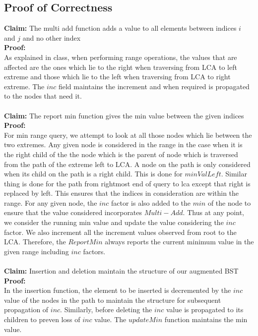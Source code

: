 \documentclass{article}
\begin{document}
\subsection*{Proof of Correctness}
\textbf{Claim:} The multi add function adds a value to all elements between indices $i$ and $j$ and no other index \\
\textbf{Proof:} \\As explained in class, when performing range operations, the values that are affected are the ones which lie to the right when traversing from LCA to left extreme and those which lie to the left when traversing from LCA to right extreme. The $inc$ field maintains the increment and when required is propagated to the nodes that need it. \\ \\
\textbf{Claim:} The report min function gives the min value between the given indices \\
\textbf{Proof:} \\For min range query, we attempt to look at all those nodes which lie between the two extremes. Any given node is considered in the range in the case when it is the right child of the the node which is the parent of node which is traversed from the path of the extreme left to LCA. A node on the path is only considered when its child on the path is a right child. This is done for $minValLeft$. Similar thing is done for the path from rightmost end of query to lca except that right is replaced by left. This ensures that the indices in consideration are within the range. For any given node, the $inc$ factor is also added to the $min$ of the node to ensure that the value considered incorporates $Multi-Add$. Thus at any point, we consider the running min value and update the value considering the $inc$ factor. We also increment all the increment values observed from root to the LCA. Therefore, the $ReportMin$ always reports the current minimum value in the given range including $inc$ factors. \\ \\
\textbf{Claim:} Insertion and deletion maintain the structure of our augmented BST \\
\textbf{Proof:} \\In the insertion function, the element to be inserted is decremented by the $inc$ value of the nodes in the path to maintain the structure for subsequent propagation of $inc$. Similarly, before deleting the $inc$ value is propagated to its children to preven loss of $inc$ value. The $updateMin$ function maintains the min value. 
\end{document}
